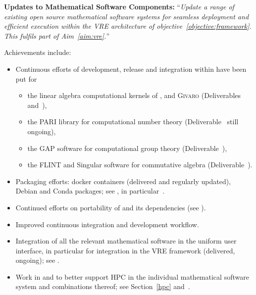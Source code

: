 \begin{compactenum}[\bf {Obj} 1\rm]
\item \label{objective:updates}
  \textbf{Updates to Mathematical Software Components:}
  ``\emph{Update a range of existing open source
  mathematical software systems for seamless deployment and efficient
  execution within the VRE architecture of objective~\ref{objective:framework}.
  This fulfils part of Aim~\ref{aim:vre}.}''

  Achievements include:
  \begin{itemize}
  \item Continuous efforts of development, release and integration within \SageMath
    have been put for
    \begin{itemize}
    \item  the linear algebra computational kernels of \Linbox,
      \fflasffpack and \textsc{Givaro} (Deliverables~ and~),
    \item the PARI library for computational number theory
      (Deliverable~ still ongoing),
    \item the GAP software for computational group theory
      (Deliverable~),
    \item the FLINT and Singular software for commutative algebra
      (Deliverable~).
    \end{itemize}
  \item Packaging efforts: docker containers (delivered and regularly
    updated), Debian and Conda packages; see
    , in
    particular~.
  \item Continued efforts on portability of \SageMath and its dependencies
    (see ).
  \item Improved continuous integration and development workflow.
  \item Integration of all the relevant mathematical software in the
    uniform \Jupyter user interface, in particular for integration in
    the VRE framework (delivered, ongoing); see
    .
  \item Work in  and  to better support HPC in the
    individual mathematical software system and combinations thereof;
    see Section~\ref{hpc} and~.

\end{itemize}
\end{compactenum}
